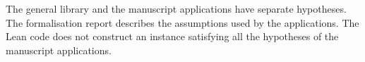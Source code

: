 \documentclass[11pt,oneside]{book}
\begin{document}
The general library and the manuscript applications have separate
hypotheses. The formalisation report describes the assumptions used by
the applications. The Lean code does not construct an instance satisfying all the hypotheses
of the manuscript applications.

\mainmatter











\backmatter

\end{document}
